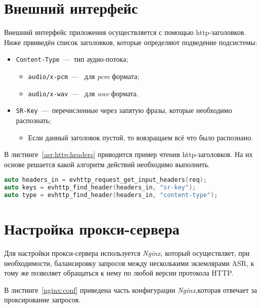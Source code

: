 \section{Внешний интерфейс}

Внешний интерфейс приложения осуществляется с помощью http-заголовков. Ниже
првиведён список заголовков, которые определяют подведение подсистемы:
\begin{itemize}
    \item \texttt{Content-Type}~---~тип аудио-потока;
    \begin{itemize}
        \item\texttt{audio/x-pcm}~---~ для \textit{pcm} формата;
        \item\texttt{audio/x-wav}~---~ для \textit{wav} формата.
    \end{itemize}
    \item \texttt{SR-Key}~---~перечисленные через запятую фразы, которые необходимо распознать;
    \begin{itemize}
        \item Если данный заголовок пустой, то вовзращаем всё что было распознано.
    \end{itemize}
\end{itemize}

В листинге~\ref{asr:http:headers} приводится пример чтения http-заголовков. На их
основе решается какой алгоритм действий необходимо выполнить.

\begin{lstlisting}[caption={Чтение заголовков},label={asr:http:headers},language=C++]
auto headers_in = evhttp_request_get_input_headers(req);
auto keys = evhttp_find_header(headers_in, "sr-key");
auto type = evhttp_find_header(headers_in, "content-type");

\end{lstlisting}

\section{Настройка прокси-сервера}

Для настройки прокси-сервера используется \textit{Nginx}, который осуществляет,
при необходимости, балансировку запросов между несколькими экземлярами ASR, к
тому же позволяет обращаться к нему по любой версии протокола HTTP.

В листинге~\ref{nginx:conf} приведена часть конфигурации \textit{Nginx},которая
отвечает за проксирование запросов.

